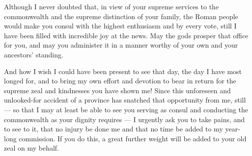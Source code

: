 

 Although I never doubted that, in view of your supreme services to the commonwealth and the supreme distinction of your family, the Roman people would make you consul with the highest enthusiasm and by every vote, still I have been filled with incredible joy at the news. May the gods prosper that office for you, and may you administer it in a manner worthy of your own and your ancestors' standing.

 And how I wish I could have been present to see that day, the day I have most longed for, and to bring my own effort and devotion to bear in return for the supreme zeal and kindnesses you have shown me! Since this unforeseen and unlooked-for accident of a province has snatched that opportunity from me, still --- so that I may at least be able to see you serving as consul and conducting the commonwealth as your dignity requires --- I urgently ask you to take pains, and to see to it, that no injury be done me and that no time be added to my year-long commission. If you do this, a great further weight will be added to your old zeal on my behalf.
